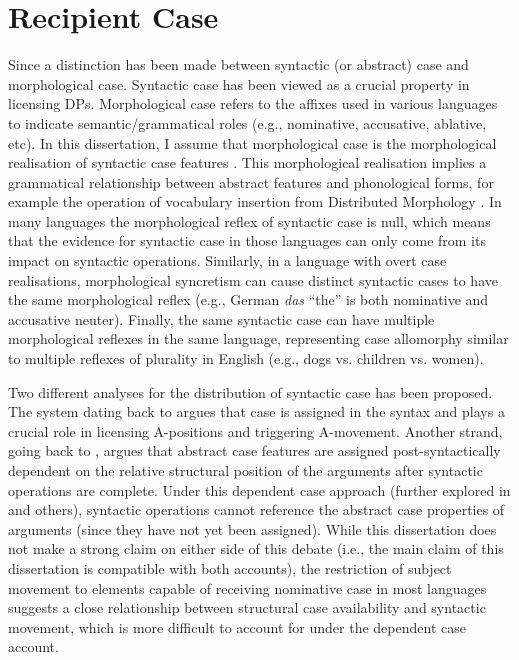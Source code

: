 \section{Recipient Case}
Since \cite{Vergnaud.1977} a distinction has been made between syntactic (or abstract) case and morphological case. Syntactic case has been viewed as a crucial property in licensing DPs. Morphological case refers to the affixes used in various languages to indicate semantic/grammatical roles (e.g., nominative, accusative, ablative, etc). In this dissertation, I assume that morphological case is the morphological realisation of syntactic case features . This morphological realisation implies a grammatical relationship between abstract features and phonological forms, for example the operation of vocabulary insertion from Distributed Morphology \citep{Halle.1993}. In many languages the morphological reflex of syntactic case is null, which means that the evidence for syntactic case in those languages can only come from its impact on syntactic operations. Similarly, in a language with overt case realisations, morphological syncretism can cause distinct syntactic cases to have the same morphological reflex (e.g., German \textit{das} ``the'' is both nominative and accusative neuter). Finally, the same syntactic case can have multiple morphological reflexes in the same language, representing case allomorphy similar to multiple reflexes of plurality in English (e.g., dogs vs. children vs. women).

Two different analyses for the distribution of syntactic case has been proposed. The system dating back to \cite{Vergnaud.1977} argues that case is assigned in the syntax and plays a crucial role in licensing A-positions and triggering A-movement. Another strand, going back to \cite{Yip.1987}, argues that abstract case features are assigned post-syntactically dependent on the relative structural position of the arguments after syntactic operations are complete. Under this dependent case approach (further explored in \citealt{Marantz.1991,McFadden.2004} and others), syntactic operations cannot reference the abstract case properties of arguments (since they have not yet been assigned). While this dissertation does not make a strong claim on either side of this debate (i.e., the main claim of this dissertation is compatible with both accounts), the restriction of subject movement to elements capable of receiving nominative case in most languages suggests a close relationship between structural case availability and syntactic movement, which is more difficult to account for under the dependent case account.

